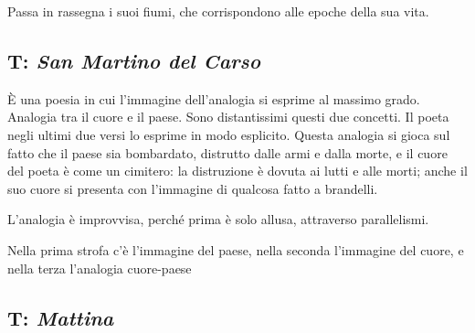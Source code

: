 Passa in rassegna i suoi fiumi, che corrispondono alle epoche della sua vita.


\subsection{T: \textit{San Martino del Carso}}

È una poesia in cui l'immagine dell'analogia si esprime al massimo grado. Analogia tra il cuore e il paese. Sono distantissimi questi due concetti. Il poeta negli ultimi due versi lo esprime in modo esplicito.
Questa analogia si gioca sul fatto che il paese sia bombardato, distrutto dalle armi e dalla morte, e il cuore del poeta è come un cimitero: la distruzione è dovuta ai lutti e alle morti; anche il suo cuore si presenta con l'immagine di qualcosa fatto a brandelli.


L’analogia è improvvisa, perché prima è solo allusa, attraverso parallelismi.

Nella prima strofa c'è l'immagine del paese, nella seconda l'immagine del cuore, e nella terza l'analogia cuore-paese

\subsection{T: \textit{Mattina}}

